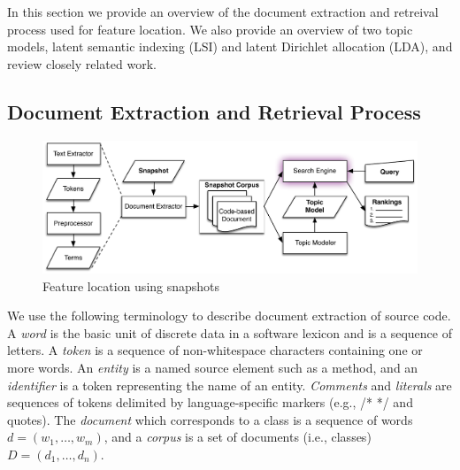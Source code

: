 
In this section we provide an overview of the document extraction and retreival process
used for feature location.
We also provide an overview of two topic models,
latent semantic indexing (LSI) and latent Dirichlet allocation (LDA),
and review closely related work.

\subsection{Document Extraction and Retrieval Process}


\begin{figure}
\vspace{2mm}
\centerline{\includegraphics[width=.75\textwidth]{figures/snapshot-flt}}
\caption{Feature location using snapshots}
\label{fig:snapshot}
\vspace{-2mm}
\end{figure}

We use the following terminology to describe document extraction of source code.
A \textit{word} is the basic unit of discrete data in a software lexicon and is a sequence of letters.
A \textit{token} is a sequence of non-whitespace characters containing one or more words.
An \textit{entity} is a named source element such as a method,
and an \textit{identifier} is a token representing the name of an entity.
\textit{Comments} and \textit{literals} are sequences of tokens delimited by language-specific markers (e.g., /* */ and quotes).
The \textit{document} which corresponds to a class is a sequence of words $d = (w_1, \ldots, w_m)$,
and a \textit{corpus} is a set of documents (i.e., classes) $D = (d_1, \ldots, d_n)$.

